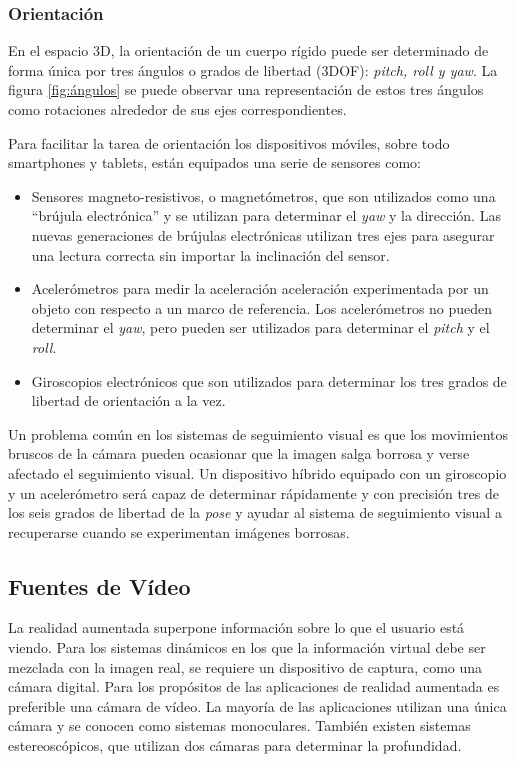 \subsubsection{Orientación}
En el espacio 3D, la orientación de un cuerpo rígido puede ser determinado de forma única por tres ángulos o grados de libertad (3DOF): \emph{pitch, roll y yaw}. La figura \ref{fig:ángulos}  se puede observar una representación de estos tres ángulos como rotaciones alrededor de sus ejes correspondientes. 

Para facilitar la tarea de orientación los dispositivos móviles, sobre todo smartphones y tablets, están equipados una serie de sensores como:

\begin{itemize}
\item Sensores magneto-resistivos, o magnetómetros, que son utilizados como una ``brújula electrónica'' y se utilizan para determinar el \emph{yaw} y la dirección. Las nuevas generaciones de brújulas electrónicas utilizan tres ejes para asegurar una lectura correcta sin importar la inclinación del sensor.
\item Acelerómetros para medir la aceleración aceleración experimentada por un objeto con respecto a un marco de referencia. Los acelerómetros no pueden determinar el \emph{yaw}, pero pueden ser utilizados para determinar el \emph{pitch} y el \emph{roll}. 
\item Giroscopios electrónicos que son utilizados para determinar los tres grados de libertad de orientación a la vez.
\end{itemize}

Un problema común en los sistemas de seguimiento visual es que los movimientos bruscos de la cámara pueden ocasionar que la imagen salga borrosa y verse afectado el seguimiento visual. Un dispositivo híbrido equipado con un giroscopio y un acelerómetro será capaz de determinar rápidamente y con precisión tres de los seis grados de libertad de la \emph{pose} y ayudar al sistema de seguimiento visual a recuperarse cuando se experimentan imágenes borrosas. 

\subsection{Fuentes de Vídeo}
La realidad aumentada superpone información sobre lo que el usuario está viendo. Para los sistemas dinámicos en los que la información virtual debe ser mezclada con la imagen real, se requiere un dispositivo de captura, como una cámara digital. Para los propósitos de las aplicaciones de realidad aumentada es preferible una cámara de vídeo. La mayoría de las aplicaciones utilizan una única cámara y se conocen como sistemas monoculares. También existen sistemas estereoscópicos, que  utilizan dos cámaras para determinar la profundidad.

